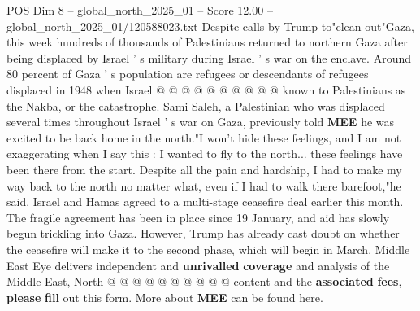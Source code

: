 \begin{textsample}{POS Dim 8 – global\_north\_2025\_01 – Score 12.00 – global\_north\_2025\_01/120588023.txt}
Despite calls by Trump to"clean out"Gaza, this week hundreds of thousands of Palestinians returned to northern Gaza after being displaced by Israel ' s military during Israel ' s war on the enclave.
Around 80 percent of Gaza ' s population are refugees or descendants of refugees displaced in 1948 when Israel @ @ @ @ @ @ @ @ @ @ known to Palestinians as the Nakba, or the catastrophe.
Sami Saleh, a Palestinian who was displaced several times throughout Israel ' s war on Gaza, previously told \textbf{MEE} he was excited to be back home in the north."I won't hide these feelings, and I am not exaggerating when I say this : I wanted to fly to the north... these feelings have been there from the start.
Despite all the pain and hardship, I had to make my way back to the north no matter what, even if I had to walk there barefoot,"he said.
Israel and Hamas agreed to a multi-stage ceasefire deal earlier this month.
The fragile agreement has been in place since 19 January, and aid has slowly begun trickling into Gaza.
However, Trump has already cast doubt on whether the ceasefire will make it to the second phase, which will begin in March.
Middle East Eye delivers independent and \textbf{unrivalled} \textbf{coverage} and analysis of the Middle East, North @ @ @ @ @ @ @ @ @ @ content and the \textbf{associated} \textbf{fees}, \textbf{please} \textbf{fill} out this form.
More about \textbf{MEE} can be found here.

\end{textsample}
